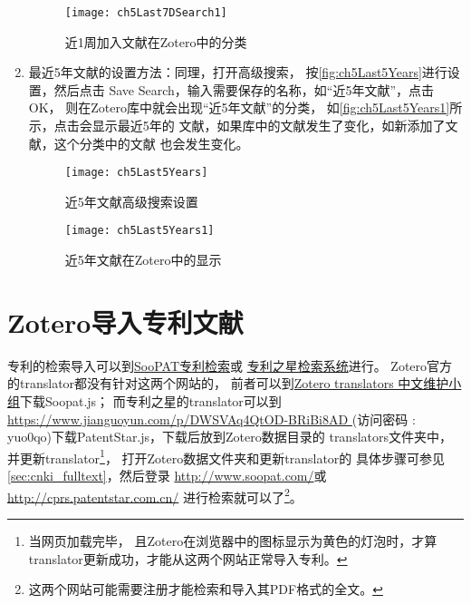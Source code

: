 \documentclass[cn,11pt,chinese]{elegantbook}
\begin{document}
\begin{enumerate}
						\begin{figure}[ht]
							\centering
							\texttt{[image: ch5Last7DSearch1]}
							\caption{近1周加入文献在Zotero中的分类}
							\label{fig:ch5Last7DSearch1}
						\end{figure}	
																
					\item 最近5年文献的设置方法：同理，打开高级搜索，
					按\autoref{fig:ch5Last5Years}进行设置，然后点击
					 Save Search，输入需要保存的名称，如“近5年文献”，点击OK，
					 则在Zotero库中就会出现“近5年文献”的分类，
					 如\autoref{fig:ch5Last5Years1}所示，点击会显示最近5年的
					 文献，如果库中的文献发生了变化，如新添加了文献，这个分类中的文献
					 也会发生变化。
							\begin{figure}[ht]
								\centering
								\texttt{[image: ch5Last5Years]}
								\caption{近5年文献高级搜索设置}
								\label{fig:ch5Last5Years}
							\end{figure}
						\begin{figure}[ht]
							\centering
							\texttt{[image: ch5Last5Years1]}
							\caption{近5年文献在Zotero中的显示}
							\label{fig:ch5Last5Years1}
						\end{figure}		
				\end{enumerate}


		
		\section{Zotero导入专利文献}\label{sec:Patent}
			专利的检索导入可以到\href{http://www.soopat.com/}{SooPAT专利检索}或
			\href{http://cprs.patentstar.com.cn/}{专利之星检索系统}进行。
			Zotero官方的translator都没有针对这两个网站的，
			前者可以到\href{https://github.com/l0o0/translators_CN}
			{Zotero translators 中文维护小组}下载Soopat.js；
			而专利之星的translator可以到\url{https://www.jianguoyun.com/p/DWSVAq4QtOD-BRiBi8AD
			} (访问密码 : yuo0qo)下载PatentStar.js，下载后放到Zotero数据目录的
			translators文件夹中，并更新translator\footnote{当网页加载完毕，
			且Zotero在浏览器中的图标显示为黄色的灯泡时，才算translator更新成功，才能从这两个网站正常导入专利。}，
			打开Zotero数据文件夹和更新translator的
			具体步骤可参见\cref{sec:cnki_fulltext}，然后登录
			\url{http://www.soopat.com/}或\url{http://cprs.patentstar.com.cn/}
			进行检索就可以了\footnote{这两个网站可能需要注册才能检索和导入其PDF格式的全文。}。
		
\end{document}
